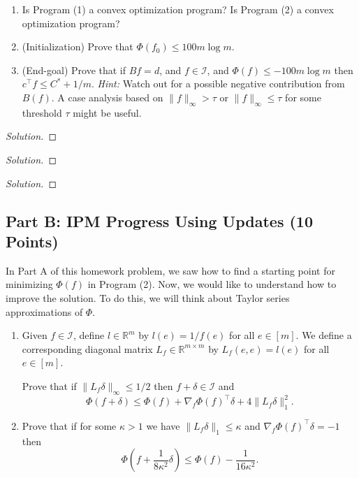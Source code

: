 \documentclass[a4paper,11pt]{article}
\newenvironment{solution}
  {\begin{proof}[Solution]}
  {\end{proof}}
\begin{document}
\begin{enumerate}[label=\arabic*.]
    \item Is Program (1) a convex optimization program? Is Program (2) a convex optimization program?
    \item (Initialization) Prove that \(\Phi(f_0)\leq 100m\log m\).
    \item (End-goal) Prove that if \(Bf = d\), and \(f\in \mathcal{I}\), and \(\Phi(f)\leq -100m\log m\) then \(c^{\top}f\leq C^{*} + 1/m\). \textit{Hint:} Watch out for a possible negative contribution from \(B(f)\). A case analysis based on \(\|f\|_{\infty} > \tau\) or \(\|f\|_{\infty}\leq \tau\) for some threshold \(\tau\) might be useful.
\end{enumerate}

\begin{solution}
\end{solution}

\begin{solution}
\end{solution}

\begin{solution}
\end{solution}

\subsection*{Part B: IPM Progress Using Updates (10 Points)}
In Part A of this homework problem, we saw how to find a starting point for minimizing \(\Phi(f)\) in Program (2). Now, we would like to understand how to improve the solution. To do this, we will think about Taylor series approximations of \(\Phi\).

\begin{enumerate}[label=\arabic*.]
    \item Given \(f\in \mathcal{I}\), define \(l\in \mathbb{R}^{m}\) by \(l(e) = 1 / f(e)\) for all \(e\in [m]\). We define a corresponding diagonal matrix \(L_{f}\in \mathbb{R}^{m\times m}\) by \(L_{f}(e,e) = l(e)\) for all \(e\in [m]\).

    Prove that if \(\|L_{f}\delta\|_{\infty}\leq 1/2\) then \(f + \delta \in \mathcal{I}\) and
    \[
    \Phi(f + \delta)\leq \Phi(f) + \nabla_{f}\Phi(f)^{\top}\delta + 4\|L_{f}\delta\|_{1}^{2}.
    \]
    \item Prove that if for some \(\kappa > 1\) we have \(\|L_{f}\delta\|_{1}\leq \kappa\) and \(\nabla_{f}\Phi(f)^{\top}\delta = -1\) then
    \[
    \Phi\left(f + \frac{1}{8\kappa^{2}}\delta\right)\leq \Phi(f) - \frac{1}{16\kappa^{2}}.
    \]
\end{enumerate}
\end{document}
